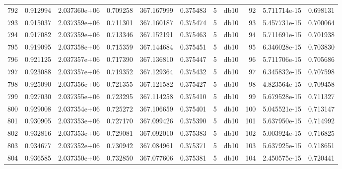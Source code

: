 \begin{tabular}{lrrrrrrlrrr}
792  &    0.912994 &        2.037360e+06 &  0.709258 &              367.167999 &    0.375483 &       5 &         db10 &     92 &   5.711714e-15 &      0.698131 \\
793  &    0.915037 &        2.037359e+06 &  0.711301 &              367.160187 &    0.375474 &       5 &         db10 &     93 &   5.457731e-15 &      0.700064 \\
794  &    0.917082 &        2.037359e+06 &  0.713346 &              367.152191 &    0.375463 &       5 &         db10 &     94 &   5.711691e-15 &      0.701938 \\
795  &    0.919095 &        2.037358e+06 &  0.715359 &              367.144684 &    0.375451 &       5 &         db10 &     95 &   6.346028e-15 &      0.703830 \\
796  &    0.921125 &        2.037357e+06 &  0.717390 &              367.136810 &    0.375447 &       5 &         db10 &     96 &   5.711706e-15 &      0.705686 \\
797  &    0.923088 &        2.037357e+06 &  0.719352 &              367.129364 &    0.375432 &       5 &         db10 &     97 &   6.345832e-15 &      0.707598 \\
798  &    0.925090 &        2.037356e+06 &  0.721355 &              367.121582 &    0.375427 &       5 &         db10 &     98 &   4.823564e-15 &      0.709458 \\
799  &    0.927030 &        2.037355e+06 &  0.723295 &              367.114258 &    0.375410 &       5 &         db10 &     99 &   5.679528e-15 &      0.711327 \\
800  &    0.929008 &        2.037354e+06 &  0.725272 &              367.106659 &    0.375401 &       5 &         db10 &    100 &   5.045521e-15 &      0.713147 \\
801  &    0.930905 &        2.037353e+06 &  0.727170 &              367.099426 &    0.375390 &       5 &         db10 &    101 &   5.637950e-15 &      0.714992 \\
802  &    0.932816 &        2.037353e+06 &  0.729081 &              367.092010 &    0.375383 &       5 &         db10 &    102 &   5.003924e-15 &      0.716825 \\
803  &    0.934677 &        2.037352e+06 &  0.730942 &              367.084961 &    0.375371 &       5 &         db10 &    103 &   5.637925e-15 &      0.718651 \\
804  &    0.936585 &        2.037350e+06 &  0.732850 &              367.077606 &    0.375381 &       5 &         db10 &    104 &   2.450575e-15 &      0.720441 \\

\end{tabular}
